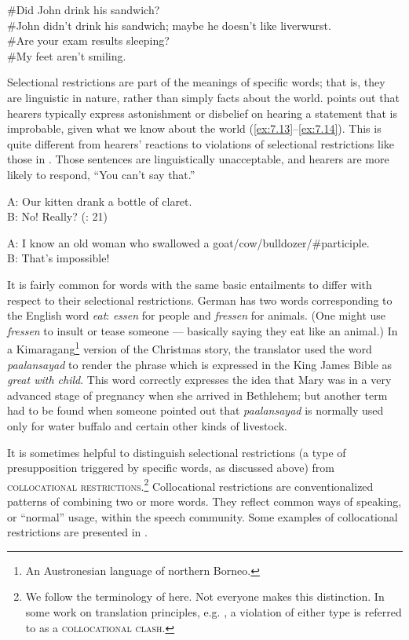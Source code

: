 \ea \label{ex:7.12}
\ea \#Did John drink his sandwich?\\
\ex \#John didn’t drink his sandwich; maybe he doesn’t like liverwurst.\\
\ex \#Are your exam results sleeping?\\
\ex \#My feet aren’t smiling.
                       \z
\z

Selectional restrictions are part of the meanings of specific words; that is, they are linguistic in nature, rather than simply facts about the world. \citet[21]{Cruse1986} points out that hearers typically express astonishment or disbelief on hearing a statement that is improbable, given what we know about the world (\ref{ex:7.13}--\ref{ex:7.14}). This is quite different from hearers’ reactions to violations of selectional restrictions like those in . Those sentences are linguistically unacceptable, and hearers are more likely to respond, “You can’t say that.”

\ea \label{ex:7.13}
A: Our kitten drank a bottle of claret.\\
B: No! Really?  (\citealt{Cruse1986}: 21)
\z

\ea \label{ex:7.14}
A: I know an old woman who swallowed a goat/cow/bulldozer/\#participle.\\
B: That’s impossible!
\z


It is fairly common for words with the same basic entailments to differ with respect to their selectional restrictions. German has two words corresponding to the English word \textit{eat}: \textit{essen} for people and \textit{fressen} for animals. (One might use \textit{fressen} to insult or tease someone — basically saying they eat like an animal.) In a Kimaragang\footnote{An Austronesian language of northern Borneo.} version of the Christmas story, the translator used the word \textit{paalansayad} to render the phrase which is expressed in the King James Bible as \textit{great with child}. This word correctly expresses the idea that Mary was in a very advanced stage of pregnancy when she arrived in Bethlehem; but another term had to be found when someone pointed out that \textit{paalansayad} is normally used only for water buffalo and certain other kinds of livestock.



It is sometimes helpful to distinguish selectional restrictions (a type of presupposition triggered by specific words, as discussed above) from \textsc{collocational restrictions}.\footnote{We follow the terminology of \citet[107, 279--280]{Cruse1986} here. Not everyone makes this distinction. In some work on translation principles, e.g. \citet{BeekmanCallow1974}, a violation of either type is referred to as a \textsc{collocational clash}.} Collocational restrictions are conventionalized patterns of combining two or more words. They reflect common ways of speaking, or “normal” usage, within the speech community. Some examples of collocational restrictions are presented in .


